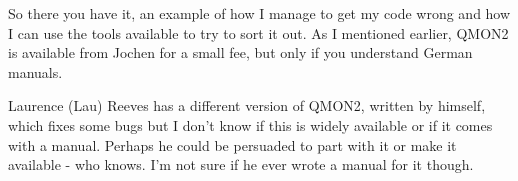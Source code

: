 \begin{appendix}
So there you have it, an example of how I manage to get my code wrong and how I
can use the tools available to try to sort it out. As I mentioned earlier, QMON2
is available from Jochen for a small fee, but only if you understand German
manuals.

Laurence (Lau) Reeves has a different version of QMON2, written by himself,
which fixes some bugs but I don't know if this is widely available or if it
comes with a manual. Perhaps he could be persuaded to part with it or make it
available -{} who knows. I'm not sure if he ever wrote a manual for it though.

\end{appendix}
